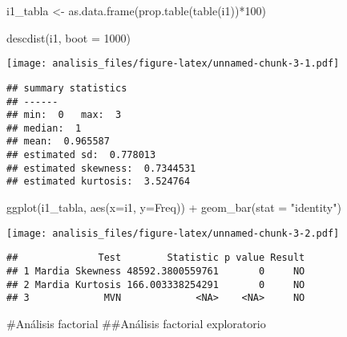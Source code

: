 \documentclass[
]{article}
\newenvironment{Shaded}{\begin{snugshade}}{\end{snugshade}}
\newcommand{\AttributeTok}[1]{\textcolor[rgb]{0.77,0.63,0.00}{#1}}
\newcommand{\DecValTok}[1]{\textcolor[rgb]{0.00,0.00,0.81}{#1}}
\newcommand{\FunctionTok}[1]{\textcolor[rgb]{0.00,0.00,0.00}{#1}}
\newcommand{\NormalTok}[1]{#1}
\newcommand{\OtherTok}[1]{\textcolor[rgb]{0.56,0.35,0.01}{#1}}
\newcommand{\SpecialCharTok}[1]{\textcolor[rgb]{0.00,0.00,0.00}{#1}}
\newcommand{\StringTok}[1]{\textcolor[rgb]{0.31,0.60,0.02}{#1}}
\begin{document}
\begin{Shaded}
\begin{Highlighting}[]
\NormalTok{i1\_tabla }\OtherTok{\textless{}{-}} \FunctionTok{as.data.frame}\NormalTok{(}\FunctionTok{prop.table}\NormalTok{(}\FunctionTok{table}\NormalTok{(i1))}\SpecialCharTok{*}\DecValTok{100}\NormalTok{)}


\FunctionTok{descdist}\NormalTok{(i1, }\AttributeTok{boot =} \DecValTok{1000}\NormalTok{)}
\end{Highlighting}
\end{Shaded}

\texttt{[image: analisis\_files/figure-latex/unnamed-chunk-3-1.pdf]}

\begin{verbatim}
## summary statistics
## ------
## min:  0   max:  3 
## median:  1 
## mean:  0.965587 
## estimated sd:  0.778013 
## estimated skewness:  0.7344531 
## estimated kurtosis:  3.524764
\end{verbatim}

\begin{Shaded}
\begin{Highlighting}[]
\FunctionTok{ggplot}\NormalTok{(i1\_tabla, }\FunctionTok{aes}\NormalTok{(}\AttributeTok{x=}\NormalTok{i1, }\AttributeTok{y=}\NormalTok{Freq)) }\SpecialCharTok{+} \FunctionTok{geom\_bar}\NormalTok{(}\AttributeTok{stat =} \StringTok{"identity"}\NormalTok{)}
\end{Highlighting}
\end{Shaded}

\texttt{[image: analisis\_files/figure-latex/unnamed-chunk-3-2.pdf]}

\begin{Shaded}
\end{Shaded}

\begin{verbatim}
##              Test        Statistic p value Result
## 1 Mardia Skewness 48592.3800559761       0     NO
## 2 Mardia Kurtosis 166.003338254291       0     NO
## 3             MVN             <NA>    <NA>     NO
\end{verbatim}

\#Análisis factorial \#\#Análisis factorial exploratorio
\end{document}
